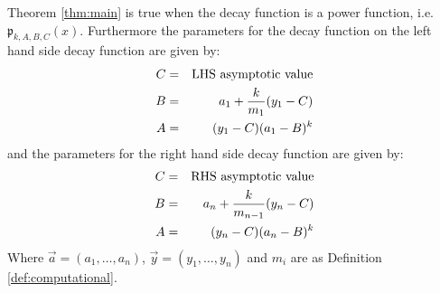 \documentclass[10pt]{article}
\begin{document}
\begin{theorem}
\label{thm:power}
Theorem \ref{thm:main} is true when the decay function is a power function, i.e.
$\mathfrak{p}_{k,A,B,C}(x)$.  Furthermore the parameters for the decay function on the left hand
side decay function are given by:
\begin{eqnarray*}
C&=& \hbox{LHS asymptotic value} \\
B&=&a_1 + \frac{k}{m_1}(y_1-C)\\
A&=&(y_1-C)(a_1-B)^k
\end{eqnarray*}
and the parameters for the right hand side decay function are given by:
\begin{eqnarray*}
C&=& \hbox{RHS asymptotic value} \\
B&=&a_n + \frac{k}{m_{n-1}}(y_n-C)\\
A&=&(y_n-C)(a_n-B)^k 
\end{eqnarray*}
Where $\vec{a}=(a_1, \ldots, a_n)$, $\vec{y}=(y_1,\ldots,y_n)$ and $m_i$ are
as Definition \ref{def:computational}.
\end{theorem}
\end{document}
